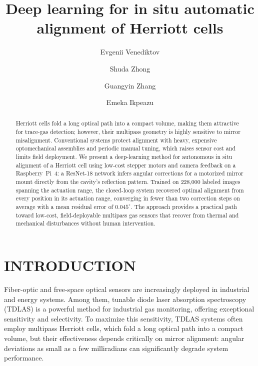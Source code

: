 \documentclass[]{spie}  %
\title{Deep learning for in situ automatic alignment of Herriott cells}
\author{Evgenii Venediktov}
\author{Shuda Zhong}
\author{Guangyin Zhang}
\author{Emeka Ikpeazu}
\affil{Department of Electrical and Computer Engineering, University of Pittsburgh, Pittsburgh, PA 15213, USA}
\begin{document}
\maketitle

\begin{abstract}
Herriott cells fold a long optical path into a compact volume, making them attractive for trace-gas detection; however, their multipass geometry is highly sensitive to mirror misalignment. Conventional systems protect alignment with heavy, expensive optomechanical assemblies and periodic manual tuning, which raises sensor cost and limits field deployment. We present a deep-learning method for autonomous in situ alignment of a Herriott cell using low-cost stepper motors and camera feedback on a Raspberry~Pi~4: a ResNet-18 network infers angular corrections for a motorized mirror mount directly from the cavity's reflection pattern. Trained on 228{,}000 labeled images spanning the actuation range, the closed-loop system recovered optimal alignment from every position in its actuation range, converging in fewer than two correction steps on average with a mean residual error of $0.045^\circ$. The approach provides a practical path toward low-cost, field-deployable multipass gas sensors that recover from thermal and mechanical disturbances without human intervention.
\end{abstract}


\section{INTRODUCTION}
\label{sec:intro}

Fiber-optic and free-space optical sensors are increasingly deployed in industrial and energy systems.\cite{zhang2025fbgdemodulation,ZHANG2026114908} Among them, tunable diode laser absorption spectroscopy (TDLAS) is a powerful method for industrial gas monitoring, offering exceptional sensitivity and selectivity.\cite{enhancementofmethanedetection,hydrogen} To maximize this sensitivity, TDLAS systems often employ multipass Herriott cells, which fold a long optical path into a compact volume,\cite{multipasscell,ultra-high-sensitive-multipass} but their effectiveness depends critically on mirror alignment: angular deviations as small as a few milliradians can significantly degrade system performance.
\end{document}
